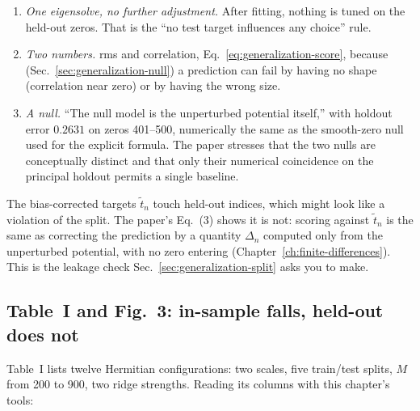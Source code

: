 \begin{enumerate}
\item \emph{One eigensolve, no further adjustment.} After fitting, nothing is tuned on the held-out zeros. That is the ``no test target influences any choice'' rule.
\item \emph{Two numbers.} rms and correlation, Eq.~\eqref{eq:generalization-score}, because (Sec.~\ref{sec:generalization-null}) a prediction can fail by having no shape (correlation near zero) or by having the wrong size.
\item \emph{A null.} ``The null model is the unperturbed potential itself,'' with holdout error $0.2631$ on zeros 401--500, numerically the same as the smooth-zero null used for the explicit formula. The paper stresses that the two nulls are conceptually distinct and that only their numerical coincidence on the principal holdout permits a single baseline.
\end{enumerate}

The bias-corrected targets $\tilde t_n$ touch held-out indices, which might look like a violation of the split. The paper's Eq.~(3) shows it is not: scoring against $\tilde t_n$ is the same as correcting the prediction by a quantity $\Delta_n$ computed only from the unperturbed potential, with no zero entering (Chapter~\ref{ch:finite-differences}). This is the leakage check Sec.~\ref{sec:generalization-split} asks you to make.

\subsection{Table~I and Fig.~3: in-sample falls, held-out does not}

Table~I lists twelve Hermitian configurations: two scales, five train/test splits, $M$ from 200 to 900, two ridge strengths. Reading its columns with this chapter's tools:

